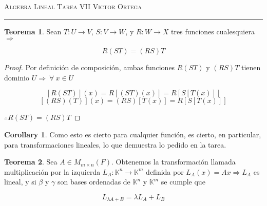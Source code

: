 \documentclass[12pt]{article}
\newcommand\K{\ensuremath{\mathbb{K}}}
\begin{document}
\thispagestyle{empty}

{\scshape Algebra Lineal} \hfill {\scshape \large Tarea VII} \hfill {\scshape Victor Ortega}
 
\smallskip

\hrule

\bigskip

\bigskip

\theoremstyle{definition}
\newtheorem*{definition}{Definición}

\theoremstyle{definition}
\newtheorem*{remark}{Observación}

\theoremstyle{definition}
\newtheorem*{dem}{Demostración}

\theoremstyle{definition}
\newtheorem*{notation}{Notación}

\theoremstyle{definition}
\newtheorem*{theorem}{Teorema}

\theoremstyle{definition}
\newtheorem*{lema}{Lema}

\theoremstyle{definition}
\newtheorem*{corollary}{Corollary}

\theoremstyle{remark}
\newtheorem*{observation}{Observación}

\theoremstyle{remark}
\newtheorem*{example}{Ejemplo}


\begin{theorem}
    Sean $T: U \to V$, $S : V \to W$, y $R : W \to X$ tres funciones cualesquiera $\Rightarrow$

    $$R(ST)= (RS)T$$
\end{theorem}

\begin{proof}
    Por definición de composición, ambas funciones $R(ST)$ y $(RS)T$ tienen dominio $U \Rightarrow \: \forall \: x \in U$

    $$[R(ST)](x)= R[(ST)(x)]= R[S[T(x)]]$$
    $$[(RS)(T)](x)=(RS)[T(x)]=R[S[T(x)]]$$

    $\therefore R(ST)= (RS)T$
\end{proof}

\begin{corollary}
    Como esto es cierto para cualquier función, es cierto, en particular, para transformaciones lineales, lo que demuestra lo pedido en la tarea. 
\end{corollary}

\begin{theorem}
    Sea $A \in M_{m \times n}(F)$. Obtenemos la transformación llamada multiplicación por la izquierda $L_A :\K^n \to \K^m$ definida por  $L_A(x)=Ax \Rightarrow L_A$ es lineal, y si $\beta$ y $\gamma$ son bases ordenadas de $\K^n$ y $\K^m$ se cumple que

    $$L_{\lambda A + B} = \lambda L_A + L_B$$
\end{theorem}
\end{document}
